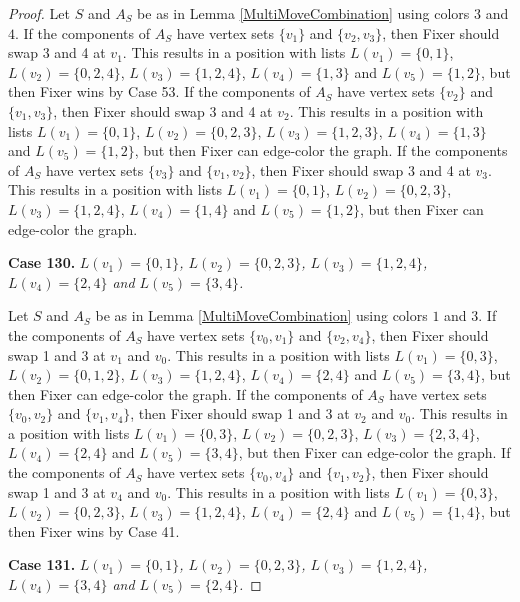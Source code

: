 \documentclass[12pt]{amsart}
\theoremstyle{plain}
\theoremstyle{definition}
\theoremstyle{remark}
\begin{document}
\begin{proof}
Let $S$ and $A_S$ be as in Lemma \ref{MultiMoveCombination} using colors $3$ and $4$. If the components of $A_S$ have vertex sets $\{v_1\}$ and $\{v_2, v_3\}$, then Fixer should swap 3 and 4 at $v_1$. This results in a position with lists $L(v_1) = \{0, 1\}$, $L(v_2) = \{0, 2, 4\}$, $L(v_3) = \{1, 2, 4\}$, $L(v_4) = \{1, 3\}$ and $L(v_5) = \{1, 2\}$, but then Fixer wins by Case 53.
If the components of $A_S$ have vertex sets $\{v_2\}$ and $\{v_1, v_3\}$, then Fixer should swap 3 and 4 at $v_2$. This results in a position with lists $L(v_1) = \{0, 1\}$, $L(v_2) = \{0, 2, 3\}$, $L(v_3) = \{1, 2, 3\}$, $L(v_4) = \{1, 3\}$ and $L(v_5) = \{1, 2\}$, but then Fixer can edge-color the graph.
If the components of $A_S$ have vertex sets $\{v_3\}$ and $\{v_1, v_2\}$, then Fixer should swap 3 and 4 at $v_3$. This results in a position with lists $L(v_1) = \{0, 1\}$, $L(v_2) = \{0, 2, 3\}$, $L(v_3) = \{1, 2, 4\}$, $L(v_4) = \{1, 4\}$ and $L(v_5) = \{1, 2\}$, but then Fixer can edge-color the graph.

\noindent\textbf{Case 130.  }\textit{$L(v_1) = \{0, 1\}$, $L(v_2) = \{0, 2, 3\}$, $L(v_3) = \{1, 2, 4\}$, $L(v_4) = \{2, 4\}$ and $L(v_5) = \{3, 4\}$.}

Let $S$ and $A_S$ be as in Lemma \ref{MultiMoveCombination} using colors $1$ and $3$. If the components of $A_S$ have vertex sets $\{v_0, v_1\}$ and $\{v_2, v_4\}$, then Fixer should swap 1 and 3 at $v_1$ and $v_0$. This results in a position with lists $L(v_1) = \{0, 3\}$, $L(v_2) = \{0, 1, 2\}$, $L(v_3) = \{1, 2, 4\}$, $L(v_4) = \{2, 4\}$ and $L(v_5) = \{3, 4\}$, but then Fixer can edge-color the graph.
If the components of $A_S$ have vertex sets $\{v_0, v_2\}$ and $\{v_1, v_4\}$, then Fixer should swap 1 and 3 at $v_2$ and $v_0$. This results in a position with lists $L(v_1) = \{0, 3\}$, $L(v_2) = \{0, 2, 3\}$, $L(v_3) = \{2, 3, 4\}$, $L(v_4) = \{2, 4\}$ and $L(v_5) = \{3, 4\}$, but then Fixer can edge-color the graph.
If the components of $A_S$ have vertex sets $\{v_0, v_4\}$ and $\{v_1, v_2\}$, then Fixer should swap 1 and 3 at $v_4$ and $v_0$. This results in a position with lists $L(v_1) = \{0, 3\}$, $L(v_2) = \{0, 2, 3\}$, $L(v_3) = \{1, 2, 4\}$, $L(v_4) = \{2, 4\}$ and $L(v_5) = \{1, 4\}$, but then Fixer wins by Case 41.

\noindent\textbf{Case 131.  }\textit{$L(v_1) = \{0, 1\}$, $L(v_2) = \{0, 2, 3\}$, $L(v_3) = \{1, 2, 4\}$, $L(v_4) = \{3, 4\}$ and $L(v_5) = \{2, 4\}$.}


\end{proof}
\end{document}
